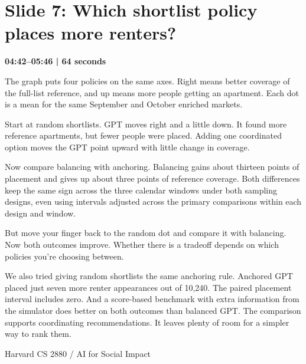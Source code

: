 \documentclass[11pt]{article}
\begin{document}
\section*{Slide 7: Which shortlist policy places more renters?}
{\color{navy}\textbf{04:42--05:46 | 64 seconds}}\par\medskip
The graph puts four policies on the same axes. Right means better coverage of the full-list reference, and up means more people getting an apartment. Each dot is a mean for the same September and October enriched markets.
\par
Start at random shortlists. GPT moves right and a little down. It found more reference apartments, but fewer people were placed. Adding one coordinated option moves the GPT point upward with little change in coverage.
\par
Now compare balancing with anchoring. Balancing gains about thirteen points of placement and gives up about three points of reference coverage. Both differences keep the same sign across the three calendar windows under both sampling designs, even using intervals adjusted across the primary comparisons within each design and window.
\par
But move your finger back to the random dot and compare it with balancing. Now both outcomes improve. Whether there is a tradeoff depends on which policies you're choosing between.
\par
We also tried giving random shortlists the same anchoring rule. Anchored GPT placed just seven more renter appearances out of 10,240. The paired placement interval includes zero. And a score-based benchmark with extra information from the simulator does better on both outcomes than balanced GPT. The comparison supports coordinating recommendations. It leaves plenty of room for a simpler way to rank them.
\par
\newpage
{\small Harvard CS 2880 / AI for Social Impact}\par
\end{document}
